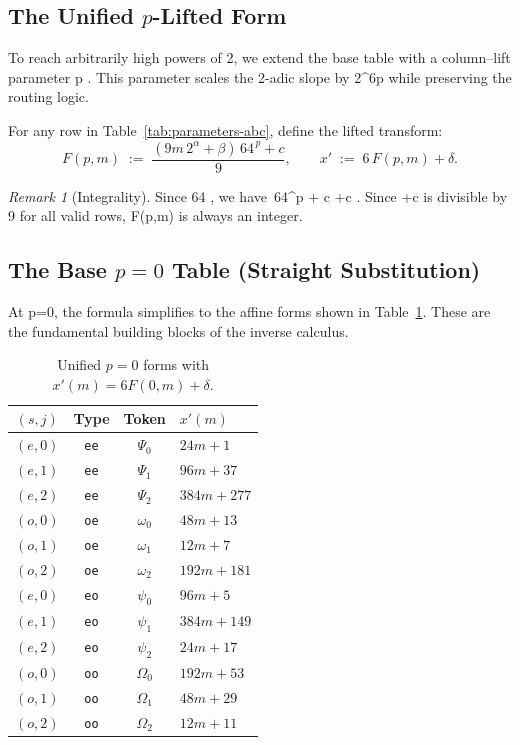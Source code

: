 \documentclass[11pt,letterpaper]{amsart}
\def\mathrm#1{#1}%
\def\({}%
\def\){}%
\theoremstyle{definition}
\theoremstyle{plain}
\theoremstyle{plain}
\theoremstyle{remark}
\newtheorem*{remark}{Remark}
\begin{document}
\subsection{The Unified \texorpdfstring{$p$}{p}-Lifted Form}
To reach arbitrarily high powers of 2, we extend the base table with a column--lift parameter \(p \). This parameter scales the 2-adic slope by \(2^{6p}\) while preserving the routing logic.

For any row in Table~\ref{tab:parameters-abc}, define the lifted transform:
\begin{equation}
\label{eq:unified-F-def}
F(p,m) \;:=\; \frac{(9m\,2^{\alpha}+\beta)\,64^{\,p}+c}{9},
\qquad
x' \;:=\; 6\,F(p,m)+\delta.
\end{equation}
\begin{remark}[Integrality]
Since \(64  \), we have \(\beta\,64^p + c \equiv \beta+c \). Since \(\beta+c\) is divisible by 9 for all valid rows, \(F(p,m)\) is always an integer.
\end{remark}

\subsection{The Base \texorpdfstring{$p=0$}{p=0} Table (Straight Substitution)}
At \(p=0\), the formula simplifies to the affine forms shown in Table~\ref{tab:unified-F0-straight-xprime}. These are the fundamental building blocks of the inverse calculus.

\begin{table}[!htbp]
\centering
\caption{Unified $p=0$ forms with $x'(m)=6F(0,m)+\delta$.}
\label{tab:unified-F0-straight-xprime}
\begin{tabular}{@{}ccc l@{}}
\toprule
$(s,j)$ & Type & Token & $x'(m)$ \\ \midrule
$(\mathrm{e},0)$ & \texttt{ee} & $\Psi_{0}$   & $24m + 1$ \\
$(\mathrm{e},1)$ & \texttt{ee} & $\Psi_{1}$   & $96m + 37$ \\
$(\mathrm{e},2)$ & \texttt{ee} & $\Psi_{2}$   & $384m + 277$ \\
$(\mathrm{o},0)$ & \texttt{oe} & $\omega_{0}$ & $48m + 13$ \\
$(\mathrm{o},1)$ & \texttt{oe} & $\omega_{1}$ & $12m + 7$ \\
$(\mathrm{o},2)$ & \texttt{oe} & $\omega_{2}$ & $192m + 181$ \\
\midrule
$(\mathrm{e},0)$ & \texttt{eo} & $\psi_{0}$   & $96m + 5$ \\
$(\mathrm{e},1)$ & \texttt{eo} & $\psi_{1}$   & $384m + 149$ \\
$(\mathrm{e},2)$ & \texttt{eo} & $\psi_{2}$   & $24m + 17$ \\
$(\mathrm{o},0)$ & \texttt{oo} & $\Omega_{0}$ & $192m + 53$ \\
$(\mathrm{o},1)$ & \texttt{oo} & $\Omega_{1}$ & $48m + 29$ \\
$(\mathrm{o},2)$ & \texttt{oo} & $\Omega_{2}$ & $12m + 11$ \\
\bottomrule
\end{tabular}
\end{table}
\end{document}
